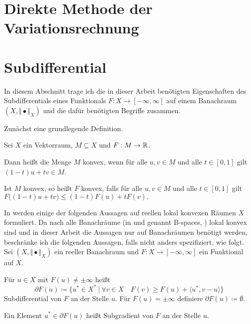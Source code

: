 \section{Direkte Methode der Variationsrechnung}

\section{Subdifferential}
In diesem Abschnitt trage ich die in dieser Arbeit benötigten Eigenschaften 
des Subdifferentials eines Funktionals $F:X\to [-\infty,\infty]$ 
auf einem Banachraum 
$(X,\Vert\bullet\Vert_X)$ und die dafür benötigten Begriffe zusammen.

Zunächst eine grundlegende Definition.

\begin{definition}
  Sei $X$ ein Vektorraum, $M\subseteq X$ und $F:M\to\mathbb{R}$. 
  
  Dann heißt die Menge $M$ konvex, wenn für alle $u,v\in M$ und alle $t\in
  [0,1]$ gilt $(1-t)u+tv\in M$.

  Ist $M$ konvex, so heißt $F$ konvex, falls für alle $u,v\in M$ und alle
  $t\in[0,1]$ gilt $F\big( (1-t)u+tv\big)\leq (1-t)F(u)+t F(v).$
\end{definition}

In \cite{Zei85} werden einige der folgenden Aussagen auf reellen lokal konvexen
Räumen $X$ formuliert.
Da nach \cite[S. 781, (43)]{Zei86} alle Banachräume 
(in \cite{Zei86} und \cite{Zei85} genannt \glqq B-spaces\grqq, \cite[S.
786]{Zei86}) lokal
konvex sind und in dieser Arbeit die Aussagen nur auf Banachräumen benötigt
werden, beschränke ich
die folgenden Aussagen, falls nicht anders spezifiziert, wie folgt.
Sei $(X,\Vert\bullet\Vert_X)$ ein reeller Banachraum und
$F:X\to [-\infty,\infty]$ ein Funktional auf $X$.

\begin{definition}
  \label{def:subdifferential}
  Für $u\in X$ mit $F(u)\neq\pm\infty$ heißt
  \begin{equation}
    \label{equ:subdifferential}
    \partial F(u)\coloneq 
    \{u^\ast\in X^\ast\ |\ 
    \forall v\in X\quad F(v)\geq F(u)+\langle u^\ast,v-u\rangle\}  
  \end{equation}
  Subdifferential von $F$ an der Stelle $u$. Für $F(u)=\pm\infty$ definiere
  $\partial F(u)\coloneq\emptyset$.

  Ein Element $u^\ast\in\partial F(u)$ heißt Subgradient von $F$ an der Stelle
  $u$.
\end{definition}

